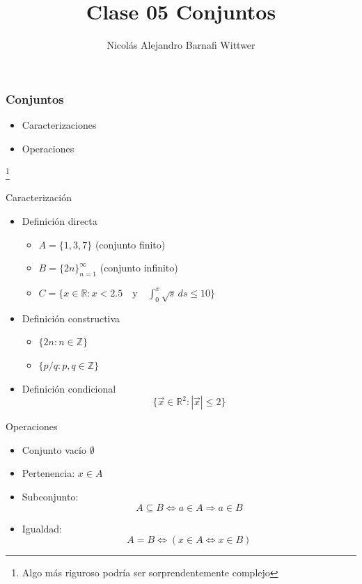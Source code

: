 \documentclass[14pt,aspectratio=169,xcolor=dvipsnames]{beamer}
\title[short title]{Clase 05 Conjuntos}
\subtitle{}
\author[NA Barnafi] {Nicolás Alejandro Barnafi Wittwer}
\institute[UC|CMM] 
{
    Pontificia Universidad Católica de Chile \\
    Centro de Modelamiento Matemático
}
\date{}
\begin{document}
\begin{frame}
    \maketitle
\end{frame}
\begin{frame}\frametitle{Conjuntos}
    \begin{itemize}
        \item Caracterizaciones
        \item Operaciones
    \end{itemize}
    \footnote{Algo más riguroso podría ser sorprendentemente complejo}

    \vspace{1cm}
\end{frame}
\begin{frame}{Caracterización}
    \begin{itemize}
        \item Definición directa
            \begin{itemize}
                \item $A = \{1,3,7\}$ (conjunto finito)
                \item $B = \{2n\}_{n=1}^\infty$ (conjunto infinito)  
                \item $C = \{x \in \mathbb R: x < 2.5 \quad\text{y}\quad  \int_0^x \sqrt s \,ds \leq 10 \} $ 
            \end{itemize}
        \item Definición constructiva
            \begin{itemize}
                \item $\{ 2n : n \in \mathbb Z \}$ 
                \item $\{p / q : p,q \in \mathbb Z\}$
            \end{itemize}
        \item Definición condicional
            $$ \{\vec x \in \mathbb R^2 : |\vec x|\leq 2 \} $$
    \end{itemize}
\end{frame}
\begin{frame}{Operaciones}
    \begin{itemize}
        \item Conjunto vacío $\emptyset$
        \item Pertenencia: $ x \in A $
        \item Subconjunto:
            $$ A\subseteq B \Leftrightarrow a\in A \Rightarrow a \in B $$
        \item Igualdad: 
             $$ A = B  \Leftrightarrow  \left(x\in A \Leftrightarrow x\in B\right) $$
    \end{itemize}
    \pause
\end{frame}
\end{document}
